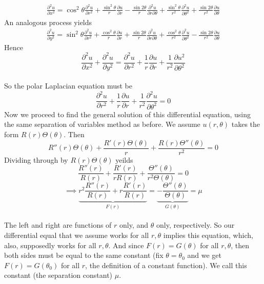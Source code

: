\documentclass[12pt]{article}
\begin{document}
{\begin{align*}
\end{align*}
\begin{align*}
\frac{\partial^2 u}{\partial x^2} = \cos^2 \theta \frac{\partial^2 u}{\partial r^2} + \frac{\sin^2 \theta}{r} \frac{\partial u}{\partial r} - \frac{\sin 2 \theta}{r} \frac{\partial^2 u}{\partial r \partial \theta} + \frac{\sin^2 \theta}{r^2} \frac{\partial^2 u}{\partial \theta^2} + \frac{\sin 2\theta}{r^2} \frac{\partial u}{\partial \theta}
\end{align*}
An analogous process yields
\begin{align*}
\frac{\partial^2 u}{\partial y^2} = \sin^2 \theta \frac{\partial^2 u}{\partial r^2} + \frac{\cos^2 \theta}{r} \frac{\partial u}{\partial r} + \frac{\sin 2 \theta}{r} \frac{\partial^2 u}{\partial r \partial \theta} + \frac{\cos^2 \theta}{r^2} \frac{\partial^2 u}{\partial \theta^2} - \frac{\sin 2\theta}{r^2} \frac{\partial u}{\partial \theta}
\end{align*}
Hence $$\frac{\partial^2 u}{\partial x^2} + \frac{\partial^2 u}{\partial y^2} = \frac{\partial^2 u}{\partial r^2} + \frac{1}{r} \frac{\partial u}{\partial r} + \frac{1}{r^2} \frac{\partial u^2}{\partial \theta^2}$$ \\
So the polar Laplacian equation must be
$$\boxed{\frac{\partial^2 u}{\partial r^2} + \frac{1}{r} \frac{\partial u}{\partial r} + \frac{1}{r^2} \frac{\partial^2 u}{\partial \theta^2} = 0}$$
Now we proceed to find the general solution of this differential equation, using the same separation of variables method as before. We assume $u(r,\theta)$ takes the form $R(r)\Theta(\theta)$. Then 
$$R''(r) \Theta(\theta) +\frac{R'(r) \Theta(\theta)}{r} + \frac{R(r) \Theta''(\theta)}{r^2} = 0$$
Dividing through by $R(r) \Theta(\theta)$ yeilds \\
$$\frac{R''(r)}{R(r)} +\frac{R'(r)}{r R(r)} + \frac{\Theta''(\theta)}{r^2 \Theta(\theta)} = 0$$
$$\implies \underbrace{ r^2 \frac{R''(r)}{R(r)} + r\frac{R'(r)}{R(r)} }_{F(r)}= \underbrace {- \frac{\Theta''(\theta)}{\Theta(\theta)} }_{G(\theta)} = \mu$$ \\
The left and right are functions of $r$ only, and $\theta$ only, respectively. So our differential equal that we assume works for all $r, \theta$ implies this equation, which, also, supposedly works for all $r, \theta$. And since $F(r) = G(\theta)$ for all $r, \theta$, then both sides must be equal to the same constant (fix $\theta = \theta_0$ and we get $F(r) = G(\theta_0)$ for all $r$, the definition of a constant function). We call this constant (the separation constant) $\mu$.
}
\end{document}
